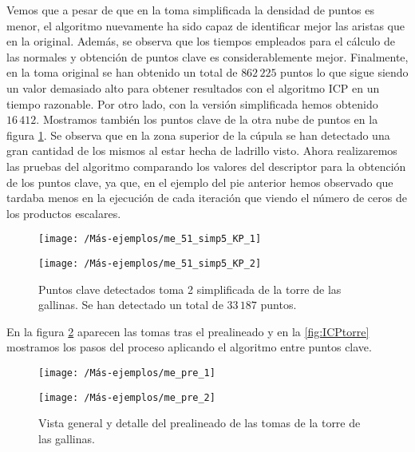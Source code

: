 Vemos que a pesar de que en la toma simplificada la densidad de puntos es menor, el algoritmo nuevamente ha sido capaz de identificar mejor las aristas que en la original. Además, se observa que los tiempos empleados para el cálculo de las normales y obtención de puntos clave es considerablemente mejor. Finalmente, en la toma original se han obtenido un total de $ 862\,225 $ puntos lo que sigue siendo un valor demasiado alto para obtener resultados con el algoritmo ICP en un tiempo razonable. Por otro lado, con la versión simplificada hemos obtenido $16\,412 $. Mostramos también los puntos clave de la otra nube de puntos en la figura \ref{me_51_KP_simp4}. Se observa que en la zona superior de la cúpula se han detectado una gran cantidad de los mismos al estar hecha de ladrillo visto. Ahora realizaremos las pruebas del algoritmo comparando los valores del descriptor para la obtención de los puntos clave, ya que, en el ejemplo del pie anterior hemos observado que tardaba menos en la ejecución de cada iteración que viendo el número de ceros de los productos escalares.

\begin{figure}[h!]	
	\begin{minipage}[b]{0.5\textwidth}
		\centering		
		\texttt{[image: /Más-ejemplos/me\_51\_simp5\_KP\_1]} 
	\end{minipage}
	\begin{minipage}[b]{0.5\textwidth}
		\texttt{[image: /Más-ejemplos/me\_51\_simp5\_KP\_2]}
	\end{minipage}
	\caption{Puntos clave detectados toma 2 simplificada de la torre de las gallinas. Se han detectado un total de $ 33\,187 $ puntos.}
	\label{me_51_KP_simp4}
\end{figure}

En la figura \ref{fig:ICPtorrePre} aparecen las tomas tras el prealineado y en la \ref{fig:ICPtorre} mostramos los pasos del proceso aplicando el algoritmo entre puntos clave. \\

\begin{figure}[h!]	
	\begin{minipage}[b]{0.5\textwidth}
		\centering		
		\texttt{[image: /Más-ejemplos/me\_pre\_1]} 
	\end{minipage}
	\begin{minipage}[b]{0.5\textwidth}
		\centering
		\texttt{[image: /Más-ejemplos/me\_pre\_2]}
	\end{minipage}
	\caption{Vista general y detalle del prealineado de las tomas de la torre de las gallinas.}
	\label{fig:ICPtorrePre}
\end{figure}

